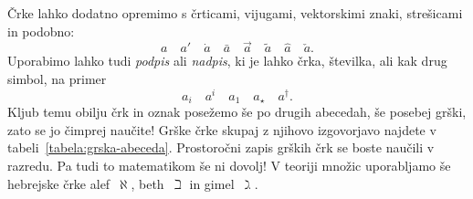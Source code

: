 Črke lahko dodatno opremimo s črticami, vijugami, vektorskimi znaki, strešicami in podobno:
%
\begin{equation*}
 a \quad
 a' \quad
 \dot{a} \quad
 \bar{a} \quad
 \vec{a} \quad
 \tilde{a} \quad
 \hat{a} \quad
 \check{a}.
\end{equation*}
%
 Uporabimo lahko tudi \emph{podpis} ali
\emph{nadpis}, ki je lahko črka, številka, ali kak drug simbol, na primer
%
\begin{equation*}
  a_i \quad
  a^i \quad
  a_1 \quad
  a_{\star} \quad
  a^{\dagger}.
\end{equation*}
%
Kljub temu obilju črk in oznak posežemo še po drugih abecedah, še posebej grški, zato
se jo čimprej naučite! Grške črke skupaj z njihovo izgovorjavo najdete v
tabeli~\ref{tabela:grska-abeceda}. Prostoročni zapis grških črk se boste naučili v
razredu.
%
Pa tudi to matematikom še ni dovolj! V teoriji množic uporabljamo še hebrejske črke
alef~$\aleph$, beth~$\beth$ in gimel~$\gimel$. 

